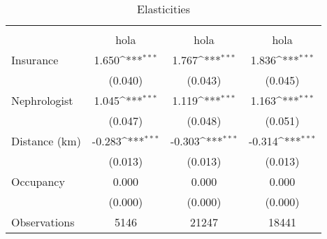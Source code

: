 \begin{table}[htbp]\centering
\def\sym#1{\ifmmode^{#1}\else\(^{#1}\)\fi}
\caption{Elasticities}
\begin{tabular}{l*{3}{c}}
\toprule
                    &\multicolumn{1}{c}{} &\multicolumn{1}{c}{} &\multicolumn{1}{c}{} \\
                    &        hola         &        hola         &        hola         \\
\midrule
Insurance           &       1.650\sym{***}&       1.767\sym{***}&       1.836\sym{***}\\
                    &     (0.040)         &     (0.043)         &     (0.045)         \\
Nephrologist        &       1.045\sym{***}&       1.119\sym{***}&       1.163\sym{***}\\
                    &     (0.047)         &     (0.048)         &     (0.051)         \\
Distance (km)       &      -0.283\sym{***}&      -0.303\sym{***}&      -0.314\sym{***}\\
                    &     (0.013)         &     (0.013)         &     (0.013)         \\
Occupancy           &       0.000         &       0.000         &       0.000         \\
                    &     (0.000)         &     (0.000)         &     (0.000)         \\
\midrule
Observations        &        5146         &       21247         &       18441         \\
\bottomrule
\end{tabular}
\end{table}
